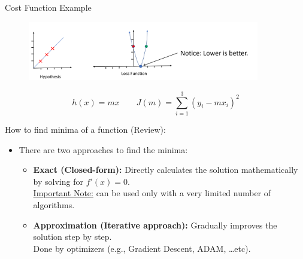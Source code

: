\begin{frame}{Cost Function Example}
    \begin{figure}
        \centering
        \includegraphics[width=0.9\textwidth]{images/linear-regression/linear-regression-8.png}
    \end{figure}

    \centering
     \hspace{0.5cm}
     \hspace{0.5cm}

    \[
        h(x) = mx \qquad
        J(m) = \sum_{i=1}^{3} (y_i - mx_i)^2
    \]
\end{frame}


\begin{frame}{How to find minima of a function (Review):}
    \begin{itemize}
        \item There are two approaches to find the minima:
        \begin{itemize}
            \item \textbf{Exact (Closed-form):} Directly calculates the solution mathematically by solving for $f'(x) = 0$.\\
            \underline{Important Note:} can be used only with a very limited number of algorithms.
            
            \item \textbf{Approximation (Iterative approach):} Gradually improves the solution step by step.\\
            Done by optimizers (e.g., Gradient Descent, ADAM, \ldots etc).
        \end{itemize}
    \end{itemize}
\end{frame}


